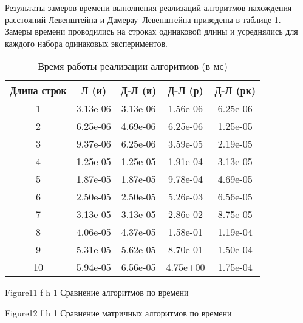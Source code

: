 Результаты замеров времени выполнения реализаций алгоритмов нахождения расстояний
Левенштейна и Дамерау–Левенштейна приведены в таблице \ref{tbl:time_measurements}. Замеры времени проводились на строках одинаковой длины и усреднялись для каждого набора одинаковых экспериментов.

\begin{table}[h]
	\begin{center}
		\begin{threeparttable}
			\captionsetup{justification=raggedright,singlelinecheck=off}
			\caption{Время работы реализации алгоритмов (в мс)}
			\label{tbl:time_measurements}
			\begin{tabular}{|c|c|c|c|c|}
				\hline
				Длина строк &  Л (и)  & Д-Л (и) & Д-Л (р) & Д-Л (рк) \\
				\hline
				1 & 3.13e-06 & 3.13e-06 & 1.56e-06 & 6.25e-06\\
				\hline
				2 & 6.25e-06 & 4.69e-06 & 6.25e-06 & 1.25e-05\\
				\hline
				3 & 9.37e-06 & 6.25e-06 & 3.59e-05 & 2.19e-05\\
				\hline
				4 & 1.25e-05 & 1.25e-05 & 1.91e-04 & 3.13e-05\\
				\hline
				5 & 1.87e-05 & 1.87e-05 & 9.78e-04 & 4.69e-05\\
				\hline
				6 & 2.50e-05 & 2.50e-05 & 5.26e-03 & 6.56e-05\\
				\hline
				7 & 3.13e-05 & 3.13e-05 & 2.86e-02 & 8.75e-05\\
				\hline
				8 & 4.06e-05 & 4.37e-05 & 1.58e-01 & 1.19e-04\\
				\hline
				9 & 5.31e-05 & 5.62e-05 & 8.70e-01 & 1.50e-04\\
				\hline
				10 & 5.94e-05 & 6.56e-05 & 4.75e+00 & 1.75e-04\\
				\hline
				
				
			\end{tabular}
		\end{threeparttable}
	\end{center}
\end{table}

{Figure11} %
{f} %
{h} %
{1\textwidth} %
{Сравнение алгоритмов по времени} %

{Figure12} %
{f} %
{h} %
{1\textwidth} %
{Сравнение матричных алгоритмов по времени} %

